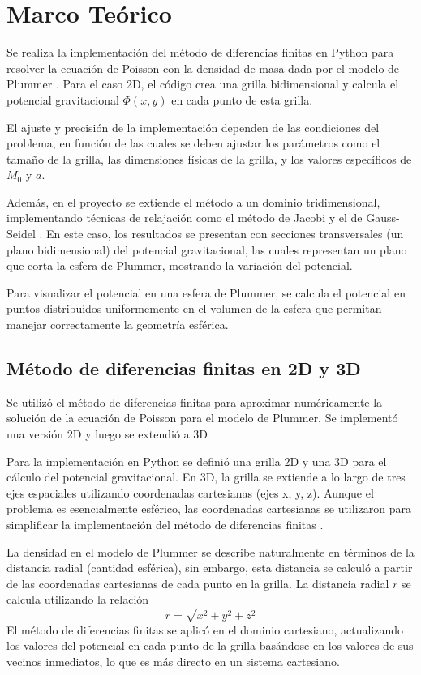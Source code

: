 \documentclass[reprint,amsmath,amssymb,aps]{revtex4-2}
\begin{document}
\section{Marco Teórico}
Se realiza la implementación del método de diferencias finitas en Python para resolver la ecuación de Poisson con la densidad de masa dada por el modelo de Plummer \cite{laplacian}. Para el caso 2D, el código crea una grilla bidimensional y calcula el potencial gravitacional $\Phi(x,y)$ en cada punto de esta grilla.

El ajuste y precisión de la implementación dependen de las condiciones del problema, en función de las cuales se deben ajustar los parámetros como el tamaño de la grilla, las dimensiones físicas de la grilla, y los valores específicos de $M_0$ y $a$.

Además, en el proyecto se extiende el método a un dominio tridimensional, implementando técnicas de relajación como el método de Jacobi \cite{jacobi} y el de Gauss-Seidel \cite{poissonGauss}. En este caso, los resultados se presentan con secciones transversales (un plano bidimensional) del potencial gravitacional, las cuales representan un plano que corta la esfera de Plummer, mostrando la variación del potencial.

Para visualizar el potencial en una esfera de Plummer, se calcula el potencial en puntos distribuidos uniformemente en el volumen de la esfera que permitan manejar correctamente la geometría esférica.

\subsection{Método de diferencias finitas en 2D y 3D}
Se utilizó el método de diferencias finitas para aproximar numéricamente la solución de la ecuación de Poisson para el modelo de Plummer. Se implementó una versión 2D y luego se extendió a 3D \cite{fdm}.

Para la implementación en Python se definió una grilla 2D y una 3D para el cálculo del potencial gravitacional. En 3D, la grilla se extiende a lo largo de tres ejes espaciales utilizando coordenadas cartesianas (ejes x, y, z). Aunque el problema es esencialmente esférico, las coordenadas cartesianas se utilizaron para simplificar la implementación del método de diferencias finitas \cite{laplacian}.

La densidad en el modelo de Plummer se describe naturalmente en términos de la distancia radial (cantidad esférica), sin embargo, esta distancia se calculó a partir de las coordenadas cartesianas de cada punto en la grilla. La distancia radial $r$ se calcula utilizando la relación
\begin{equation}
    r = \sqrt{x^2 + y^2 + z^2}
\end{equation}
El método de diferencias finitas se aplicó en el dominio cartesiano, actualizando los valores del potencial en cada punto de la grilla basándose en los valores de sus vecinos inmediatos, lo que es más directo en un sistema cartesiano.
\end{document}
